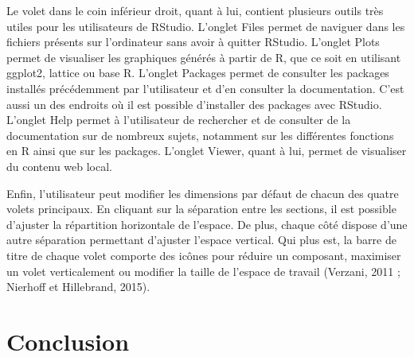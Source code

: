 \documentclass[
  letterpaper,
  DIV=11,
  numbers=noendperiod]{scrreprt}
\begin{document}
Le volet dans le coin inférieur droit, quant à lui, contient plusieurs
outils très utiles pour les utilisateurs de RStudio. L'onglet Files
permet de naviguer dans les fichiers présents sur l'ordinateur sans
avoir à quitter RStudio. L'onglet Plots permet de visualiser les
graphiques générés à partir de R, que ce soit en utilisant ggplot2,
lattice ou base R. L'onglet Packages permet de consulter les packages
installés précédemment par l'utilisateur et d'en consulter la
documentation. C'est aussi un des endroits où il est possible
d'installer des packages avec RStudio. L'onglet Help permet à
l'utilisateur de rechercher et de consulter de la documentation sur de
nombreux sujets, notamment sur les différentes fonctions en R ainsi que
sur les packages. L'onglet Viewer, quant à lui, permet de visualiser du
contenu web local.

Enfin, l'utilisateur peut modifier les dimensions par défaut de chacun
des quatre volets principaux. En cliquant sur la séparation entre les
sections, il est possible d'ajuster la répartition horizontale de
l'espace. De plus, chaque côté dispose d'une autre séparation permettant
d'ajuster l'espace vertical. Qui plus est, la barre de titre de chaque
volet comporte des icônes pour réduire un composant, maximiser un volet
verticalement ou modifier la taille de l'espace de travail (Verzani,
2011 ; Nierhoff et Hillebrand, 2015).

\hypertarget{conclusion-1}{%
\section{Conclusion}\label{conclusion-1}}
\end{document}
